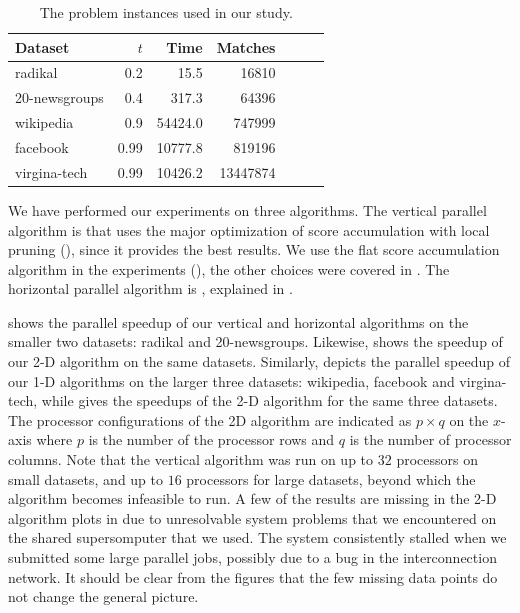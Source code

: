 \documentclass{comjnl}
\begin{document}
\begin{table}
  \centering
  \caption{The problem instances used in our study.}
  \begin{tabular}{l r r r r r l}
    Dataset &  $t$ & Time & Matches \\ \hline
    radikal & 0.2 & 15.5  & 16810 \\
    20-newsgroups & 0.4 & 317.3  & 64396 \\
    wikipedia & 0.9  & 54424.0 & 747999 \\
    facebook & 0.99 & 10777.8 & 819196\\
    virgina-tech & 0.99 & 10426.2 & 13447874
  \end{tabular}
  \label{tab:problems}
\end{table}


We have performed our experiments on three algorithms. The vertical
parallel algorithm is  that uses
the major optimization of score accumulation with local pruning
(), since it provides the best results.
 We use the flat score accumulation algorithm in the experiments
(), the other choices were covered in
. The horizontal parallel algorithm is
, explained in
.

 shows the parallel speedup of our
vertical and horizontal algorithms on the smaller two datasets:
radikal and 20-newsgroups. Likewise, 
shows the speedup of our 2-D algorithm on the same datasets.
Similarly,  depicts the parallel speedup
of our 1-D algorithms on the larger three datasets: wikipedia,
facebook and virgina-tech, while  gives
the speedups of the 2-D algorithm for the same three datasets.  The
processor configurations of the 2D algorithm are indicated as $p
\times q$ on the $x$-axis where $p$ is the number of the processor
rows and $q$ is the number of processor columns. Note that the
vertical algorithm was run on up to $32$ processors on small datasets,
and up to $16$ processors for large datasets, beyond which the
algorithm becomes infeasible to run. A few of the results are missing
in the 2-D algorithm plots in  due to
unresolvable system problems that we encountered on the shared
supersomputer that we used. The system consistently stalled when
we submitted some large parallel jobs, possibly due to a bug in the
interconnection network. It should be clear from the figures that the
few missing data points do not change the general picture.
\end{document}
